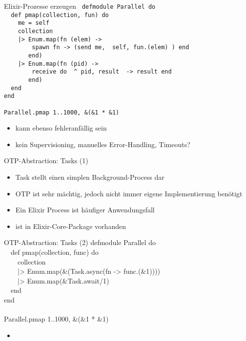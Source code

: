 \documentclass[compress]{beamer}
\begin{document}
  \begin{frame}{Elixir-Prozesse erzeugen}
    \texttt{
defmodule Parallel do\\
~~def pmap(collection, fun) do\\
~~~~me = self\\
~~~~collection\\
~~~~|> Enum.map(fn (elem) ->\\
~~~~~~~~spawn fn -> (send me, { self, fun.(elem) }) end\\
~~~~~~~end)\\
~~~~|> Enum.map(fn (pid) ->\\
~~~~~~~~receive do { \^~pid, result } -> result end\\
~~~~~~~end)\\
~~end\\
end\\
    ~\\
    Parallel.pmap 1..1000, \&(\&1 * \&1)\\
  } 
    \begin{itemize}
      \item<2-2> kann ebenso fehleranfällig sein
      \item<2-2> kein Supervisioning, manuelles Error-Handling, Timeouts?
    \end{itemize}
  \end{frame}
  \begin{frame}{OTP-Abstraction: Tasks (1)}
    \begin{itemize}
      \item Task stellt einen simplen Background-Process dar
      \item OTP ist sehr mächtig, jedoch nicht immer eigene Implementierung benötigt
      \item Ein Elixir Process ist häufiger Anwendungsfall
      \item ist in Elixir-Core-Package vorhanden
    \end{itemize}
  \end{frame}
  

  \begin{frame}{OTP-Abstraction: Tasks (2)}
    defmodule Parallel do\\
    ~~def pmap(collection, func) do\\
    ~~~~collection \\
    ~~~~|> Enum.map(\&(Task.async(fn -> func.(\&1))))\\
    ~~~~|> Enum.map(\&Task.await/1) \\
    ~~end\\
    end\\
    ~\\
    Parallel.pmap 1..1000, \&(\&1 * \&1)\\
    \begin{itemize}
      \item<2-2>
    \end{itemize}
  \end{frame}
\end{document}

